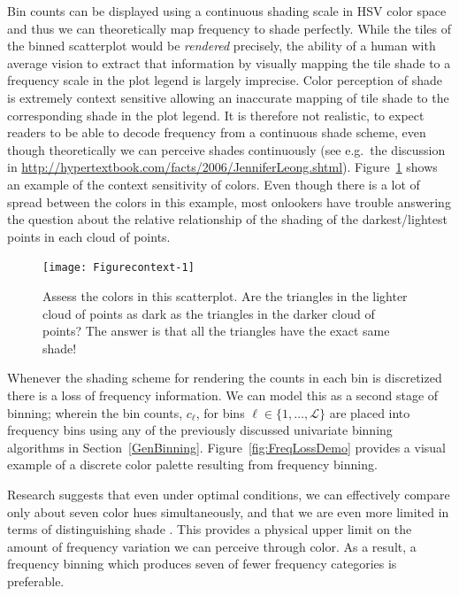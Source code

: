\documentclass[11pt]{isuthesis}\usepackage[]{graphicx}\usepackage[]{color}
\newenvironment{knitrout}{}{} %
\begin{document}
Bin counts can be displayed using a continuous shading scale in HSV color space \citep{colorperception} and thus we can theoretically map frequency to shade perfectly. While the tiles of the binned scatterplot would be \textit{rendered} precisely, the ability of a human with average vision to extract that information by visually mapping the tile shade to a frequency scale in the plot legend is largely imprecise. Color perception of shade is extremely context sensitive allowing an inaccurate mapping of tile shade to the corresponding shade in the plot legend.
It is therefore not realistic, to expect readers to be able to decode frequency from a continuous shade scheme, even though theoretically we can perceive shades continuously (see e.g.\ the discussion in \url{http://hypertextbook.com/facts/2006/JenniferLeong.shtml}). Figure~\ref{fig:context} shows an example of the context sensitivity of colors. Even though there is a lot of spread between the colors in this example, most onlookers have trouble answering the question about the relative relationship of the shading of the darkest/lightest points in each cloud of points.


\begin{figure}[hbtp]
\centering
\begin{knitrout}
\color{fgcolor}

{\centering \texttt{[image: Figurecontext-1]} 

}



\end{knitrout}
\caption{\label{fig:context}Assess the colors in this scatterplot. Are the triangles in the lighter cloud of points as dark as the triangles in the darker cloud of points? The answer is that all the triangles have the exact same shade!}
\end{figure}

 Whenever the shading scheme for rendering the counts in each bin is discretized there is a loss of frequency information. We can model this as a second stage of binning; wherein the bin counts, $c_\ell$, for bins $\ell \in \{1, \dots, \mathscr{L} \}$ are placed into frequency bins using any of the previously discussed univariate binning algorithms in Section~\ref{GenBinning}.  Figure~\ref{fig:FreqLossDemo} provides a visual example of a discrete color palette resulting from frequency binning.  
 
Research suggests that even under optimal conditions, we can effectively compare only about seven color hues simultaneously, and that we are even more limited in terms of distinguishing shade \citep{colorperception}. This provides a physical upper limit on the amount of frequency variation we can perceive through color. As a result, a frequency binning which produces seven of fewer frequency categories is preferable.
\end{document}
